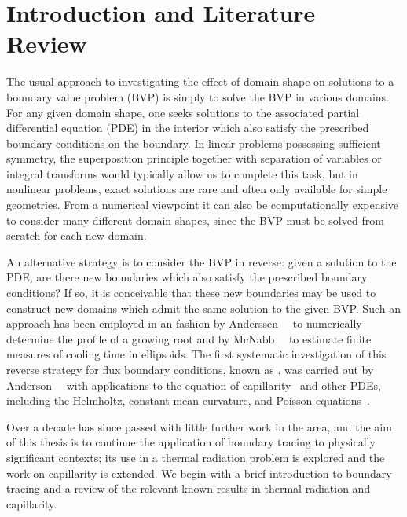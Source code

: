 \chapter{Introduction and Literature Review}
\label{ch:introduction}

The usual approach
to investigating the effect of domain shape
on solutions to a boundary value problem (BVP)
is simply to solve the BVP in various domains.
For any given domain shape, one seeks solutions
to the associated partial differential equation (PDE) in the interior
which also satisfy the prescribed boundary conditions on the boundary.
In linear problems possessing sufficient symmetry,
the superposition principle
together with separation of variables or integral transforms
would typically allow us to complete this task,
but in nonlinear problems,
exact solutions are rare and often only available for simple geometries.
From a numerical viewpoint
it can also be computationally expensive
to consider many different domain shapes,
since the BVP must be solved from scratch for each new domain.

An alternative strategy is to
consider the BVP in reverse:
given a solution to the PDE\@, are there new boundaries
which also satisfy the prescribed boundary conditions?
If so, it is conceivable that these new boundaries may be used
to construct new domains
which admit the same solution to the given BVP\@.
Such an approach has been employed in an \adhoc{} fashion
by Anderssen~\etal~\cite{anderssen-1969-ion-uptake-growing-roots}
to numerically determine the profile of a growing root
and by McNabb~\etal~\cite{mcnabb-1991-theoretical-derivation-freezing-times}
to estimate finite measures of cooling time in ellipsoids.
The first systematic investigation of this
reverse strategy for flux boundary conditions,
known as ,
was carried out by
Anderson~\etal~\cite{anderson-2007-boundary-tracing-i-theory}
with applications to the \laplaceyoung{} equation
of capillarity~\cite{anderson-2006-exact-solutions-laplace-young}
and other PDEs, including the Helmholtz,
constant mean curvature, and
Poisson equations~\cite{anderson-2007-boundary-tracing-ii-applications}.

Over a decade has since passed
with little further work in the area,
and the aim of this thesis is to
continue the application of boundary tracing
to physically significant contexts;
its use in a thermal radiation problem is explored
and the work on capillarity is extended.
We begin with a brief introduction to boundary tracing
and a review of the relevant known results
in thermal radiation and capillarity.

